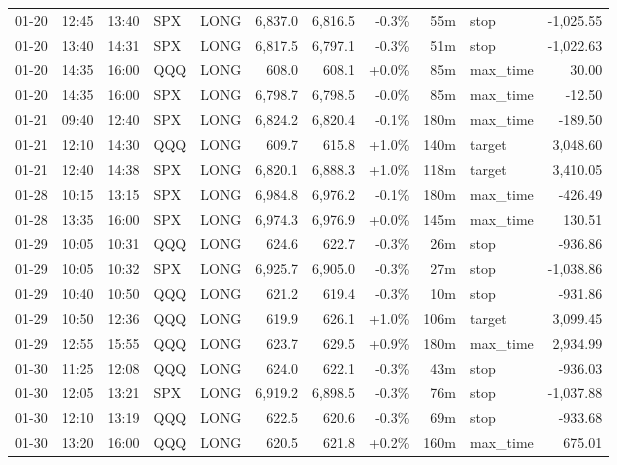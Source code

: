 \documentclass[11pt,a4paper,twoside]{article}
\begin{document}
\begin{center}
\begin{longtable}{>{\color{txtmain}}l l l l l r r r r >{\color{txtmain}}l r}
01-20 & 12:45 & 13:40 & SPX & LONG & 6,837.0 & 6,816.5 & \textcolor{lossred}{-0.3\%} & 55m & stop & \textcolor{lossred}{-1,025.55} \\
01-20 & 13:40 & 14:31 & SPX & LONG & 6,817.5 & 6,797.1 & \textcolor{lossred}{-0.3\%} & 51m & stop & \textcolor{lossred}{-1,022.63} \\
01-20 & 14:35 & 16:00 & QQQ & LONG & 608.0 & 608.1 & \textcolor{wingreen}{+0.0\%} & 85m & max\_time & \textcolor{wingreen}{30.00} \\
01-20 & 14:35 & 16:00 & SPX & LONG & 6,798.7 & 6,798.5 & \textcolor{lossred}{-0.0\%} & 85m & max\_time & \textcolor{lossred}{-12.50} \\
01-21 & 09:40 & 12:40 & SPX & LONG & 6,824.2 & 6,820.4 & \textcolor{lossred}{-0.1\%} & 180m & max\_time & \textcolor{lossred}{-189.50} \\
01-21 & 12:10 & 14:30 & QQQ & LONG & 609.7 & 615.8 & \textcolor{wingreen}{+1.0\%} & 140m & target & \textcolor{wingreen}{3,048.60} \\
01-21 & 12:40 & 14:38 & SPX & LONG & 6,820.1 & 6,888.3 & \textcolor{wingreen}{+1.0\%} & 118m & target & \textcolor{wingreen}{3,410.05} \\
01-28 & 10:15 & 13:15 & SPX & LONG & 6,984.8 & 6,976.2 & \textcolor{lossred}{-0.1\%} & 180m & max\_time & \textcolor{lossred}{-426.49} \\
01-28 & 13:35 & 16:00 & SPX & LONG & 6,974.3 & 6,976.9 & \textcolor{wingreen}{+0.0\%} & 145m & max\_time & \textcolor{wingreen}{130.51} \\
01-29 & 10:05 & 10:31 & QQQ & LONG & 624.6 & 622.7 & \textcolor{lossred}{-0.3\%} & 26m & stop & \textcolor{lossred}{-936.86} \\
01-29 & 10:05 & 10:32 & SPX & LONG & 6,925.7 & 6,905.0 & \textcolor{lossred}{-0.3\%} & 27m & stop & \textcolor{lossred}{-1,038.86} \\
01-29 & 10:40 & 10:50 & QQQ & LONG & 621.2 & 619.4 & \textcolor{lossred}{-0.3\%} & 10m & stop & \textcolor{lossred}{-931.86} \\
01-29 & 10:50 & 12:36 & QQQ & LONG & 619.9 & 626.1 & \textcolor{wingreen}{+1.0\%} & 106m & target & \textcolor{wingreen}{3,099.45} \\
01-29 & 12:55 & 15:55 & QQQ & LONG & 623.7 & 629.5 & \textcolor{wingreen}{+0.9\%} & 180m & max\_time & \textcolor{wingreen}{2,934.99} \\
01-30 & 11:25 & 12:08 & QQQ & LONG & 624.0 & 622.1 & \textcolor{lossred}{-0.3\%} & 43m & stop & \textcolor{lossred}{-936.03} \\
01-30 & 12:05 & 13:21 & SPX & LONG & 6,919.2 & 6,898.5 & \textcolor{lossred}{-0.3\%} & 76m & stop & \textcolor{lossred}{-1,037.88} \\
01-30 & 12:10 & 13:19 & QQQ & LONG & 622.5 & 620.6 & \textcolor{lossred}{-0.3\%} & 69m & stop & \textcolor{lossred}{-933.68} \\
01-30 & 13:20 & 16:00 & QQQ & LONG & 620.5 & 621.8 & \textcolor{wingreen}{+0.2\%} & 160m & max\_time & \textcolor{wingreen}{675.01} \\
\end{longtable}
\end{center}
\clearpage
\end{document}
